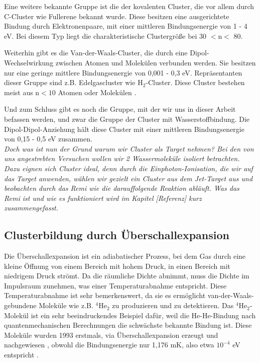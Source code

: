 Eine weitere bekannte Gruppe ist die der kovalenten Cluster, die vor allem durch C-Cluster wie Fullerene bekannt wurde. Diese besitzen eine ausgerichtete Bindung durch Elektronenpaare, mit einer mittleren Bindungsenergie von 1 - 4 eV. Bei diesem Typ liegt die charakteristische Clustergröße bei 30 $\mathrm{< n <}$ 80.

Weiterhin gibt es die Van-der-Waals-Cluster, die durch eine Dipol-Wechselwirkung zwischen Atomen und Molekülen verbunden werden. Sie besitzen nur eine geringe mittlere Bindungsenergie von 0,001 - 0,3 eV. Repräsentanten dieser Gruppe sind z.B. Edelgascluster wie $\mathrm{H}_2$-Cluster. Diese Cluster bestehen meist aus $\mathrm{n < 10}$ Atomen oder Molekülen .

Und zum Schluss gibt es noch die Gruppe, mit der wir uns in dieser Arbeit befassen werden, und zwar die Gruppe der Cluster mit Wasserstoffbindung. Die Dipol-Dipol-Anziehung hält diese Cluster mit einer mittleren Bindungsenergie von 0,15 - 0,5 eV zusammen. \\

\textit{Doch was ist nun der Grund warum wir Cluster als Target nehmen?
Bei den von uns angestrebten Versuchen wollen wir 2 Wassermoleküle isoliert betrachten. Dazu eignen sich Cluster ideal, denn durch die Einphoton-Ionisation, die wir auf das Target anwenden, wählen wir gezielt ein Cluster aus dem Jet-Target aus und beobachten durch das Remi wie die darauffolgende Reaktion abläuft. Was das Remi ist und wie es funktioniert wird im Kapitel [Referenz] kurz zusammengefasst.}

\subsection{Clusterbildung durch Überschallexpansion}

Die Überschallexpansion ist ein adiabatischer Prozess, bei dem Gas durch eine kleine Öffnung von einem Bereich mit hohem Druck, in einen Bereich mit niedrigem Druck strömt. Da die räumliche Dichte abnimmt, muss die Dichte im Impulsraum zunehmen, was einer Temperaturabnahme entspricht. Diese Temperaturabnahme ist sehr bemerkenswert, da sie es ermöglicht van-der-Waals-gebundene Moleküle wie z.B. $\mathrm{^4}\mathrm{He}_2$ zu produzieren und zu detektieren. Das $\mathrm{^4}\mathrm{He}_2$-Molekül ist ein sehr beeindruckendes Beispiel dafür, weil die He-He-Bindung nach quantenmechanischen Berechnungen die schwächste bekannte Bindung ist. Diese Moleküle wurden 1993 erstmals, via Überschallexpansion erzeugt und nachgewiesen \cite{Luo1993}, obwohl die Bindungsenergie  nur 1,176 mK, also etwa $\mathrm{10^{-4}}$ eV entspricht \cite{Lohr2007}. 

